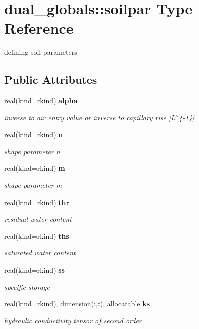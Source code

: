 \section{dual\+\_\+globals\+:\+:soilpar Type Reference}
\label{structdual__globals_1_1soilpar}


defining soil parameters  


\subsection*{Public Attributes}
\begin{DoxyCompactItemize}
\item 
real(kind=rkind) {\bf alpha}
\begin{DoxyCompactList}\small\item\em inverse to air entry value or inverse to capillary rise [L$^\wedge$\{-\/1\}] \end{DoxyCompactList}\item 
real(kind=rkind) {\bf n}
\begin{DoxyCompactList}\small\item\em shape parameter n \end{DoxyCompactList}\item 
real(kind=rkind) {\bf m}
\begin{DoxyCompactList}\small\item\em shape parameter m \end{DoxyCompactList}\item 
real(kind=rkind) {\bf thr}
\begin{DoxyCompactList}\small\item\em residual water content \end{DoxyCompactList}\item 
real(kind=rkind) {\bf ths}
\begin{DoxyCompactList}\small\item\em saturated water content \end{DoxyCompactList}\item 
real(kind=rkind) {\bf ss}
\begin{DoxyCompactList}\small\item\em specific storage \end{DoxyCompactList}\item 
real(kind=rkind), dimension(\+:,\+:), allocatable {\bf ks}
\begin{DoxyCompactList}\small\item\em hydraulic conductivity tensor of second order \end{DoxyCompactList}\item 

\end{DoxyCompactItemize}
